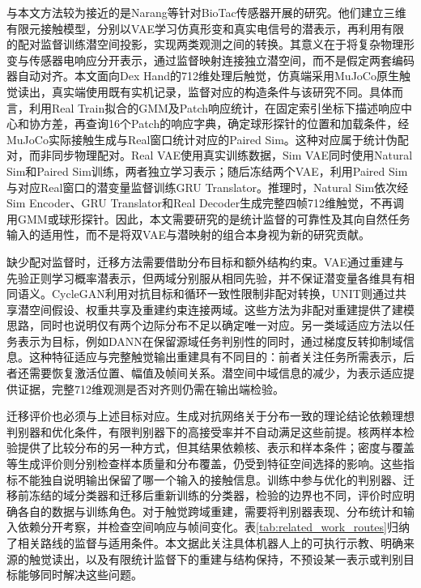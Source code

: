 与本文方法较为接近的是Narang等针对BioTac传感器开展的研究。他们建立三维有限元接触模型，分别以VAE学习仿真形变和真实电信号的潜表示，再利用有限的配对监督训练潜空间投影，实现两类观测之间的转换\cite{narang2021latentprojections}。其意义在于将复杂物理形变与传感器电响应分开表示，通过监督映射连接独立潜空间，而不是假定两套编码器自动对齐。本文面向Dex Hand的712维处理后触觉，仿真端采用MuJoCo原生触觉读出，真实端使用既有实机记录，监督对应的构造条件与该研究不同。具体而言，利用Real Train拟合的GMM及Patch响应统计，在固定索引坐标下描述响应中心和协方差，再查询16个Patch的响应字典，确定球形探针的位置和加载条件，经MuJoCo实际接触生成与Real窗口统计对应的Paired Sim。这种对应属于统计伪配对，而非同步物理配对。Real VAE使用真实训练数据，Sim VAE同时使用Natural Sim和Paired Sim训练，两者独立学习表示；随后冻结两个VAE，利用Paired Sim与对应Real窗口的潜变量监督训练GRU Translator。推理时，Natural Sim依次经Sim Encoder、GRU Translator和Real Decoder生成完整四帧712维触觉，不再调用GMM或球形探针。因此，本文需要研究的是统计监督的可靠性及其向自然任务输入的适用性，而不是将双VAE与潜映射的组合本身视为新的研究贡献。

缺少配对监督时，迁移方法需要借助分布目标和额外结构约束。VAE通过重建与先验正则学习概率潜表示，但两域分别服从相同先验，并不保证潜变量各维具有相同语义\cite{kingma2014vae}。CycleGAN利用对抗目标和循环一致性限制非配对转换，UNIT则通过共享潜空间假设、权重共享及重建约束连接两域\cite{zhu2017cyclegan,liu2017unit}。这些方法为非配对重建提供了建模思路，同时也说明仅有两个边际分布不足以确定唯一对应。另一类域适应方法以任务表示为目标，例如DANN在保留源域任务判别性的同时，通过梯度反转抑制域信息\cite{ganin2016dann}。这种特征适应与完整触觉输出重建具有不同目的：前者关注任务所需表示，后者还需要恢复激活位置、幅值及帧间关系。潜空间中域信息的减少，为表示适应提供证据，完整712维观测是否对齐则仍需在输出端检验。

迁移评价也必须与上述目标对应。生成对抗网络关于分布一致的理论结论依赖理想判别器和优化条件，有限判别器下的高接受率并不自动满足这些前提\cite{goodfellow2014gan}。核两样本检验提供了比较分布的另一种方式，但其结果依赖核、表示和样本条件\cite{gretton2012mmd}；密度与覆盖等生成评价则分别检查样本质量和分布覆盖，仍受到特征空间选择的影响\cite{naeem2020metrics}。这些指标不能独自说明输出保留了哪一个输入的接触信息。训练中参与优化的判别器、迁移前冻结的域分类器和迁移后重新训练的分类器，检验的边界也不同，评价时应明确各自的数据与训练角色。对于触觉跨域重建，需要将判别器表现、分布统计和输入依赖分开考察，并检查空间响应与帧间变化。表\ref{tab:related_work_routes}归纳了相关路线的监督与适用条件。本文据此关注具体机器人上的可执行示教、明确来源的触觉读出，以及有限统计监督下的重建与结构保持，不预设某一表示或判别目标能够同时解决这些问题。

